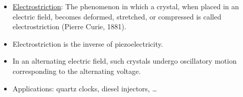 \documentclass[t,aspectratio=169,xcolor=dvipsnames]{beamer}
\begin{document}
\begin{frame}
\begin{itemize}
\pagebreak
\item \underline{Electrostriction}: The phenomenon in which a crystal, when placed in an electric field, becomes deformed, stretched, or compressed is called electrostriction (Pierre Curie, 1881).
\item Electrostriction is the inverse of piezoelectricity.
\item In an alternating electric field, such crystals undergo oscillatory motion corresponding to the alternating voltage.
\item Applications: quartz clocks, diesel injectors, \dots
\end{itemize}
\end{frame}

\end{document}
